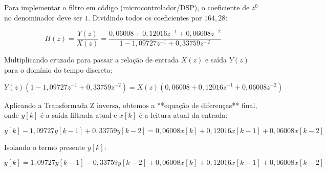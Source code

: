 Para implementar o filtro em código (microcontrolador/DSP), o coeficiente de $z^0$ no denominador deve ser $1$. Dividindo todos os coeficientes por $164{,}28$:

$$H(z) = \frac{Y(z)}{X(z)} = \frac{0{,}06008 + 0{,}12016z^{-1} + 0{,}06008z^{-2}}{1 - 1{,}09727z^{-1} + 0{,}33759z^{-2}}$$

Multiplicando cruzado para passar a relação de entrada $X(z)$ e saída $Y(z)$ para o domínio do tempo discreto:

$$Y(z) \left( 1 - 1{,}09727z^{-1} + 0{,}33759z^{-2} \right) = X(z) \left( 0{,}06008 + 0{,}12016z^{-1} + 0{,}06008z^{-2} \right)$$

Aplicando a Transformada Z inversa, obtemos a **equação de diferenças** final, onde $y[k]$ é a saída filtrada atual e $x[k]$ é a leitura atual da entrada:

$$y[k] - 1{,}09727y[k-1] + 0{,}33759y[k-2] = 0{,}06008x[k] + 0{,}12016x[k-1] + 0{,}06008x[k-2]$$

Isolando o termo presente $y[k]$:

$$y[k] = 1{,}09727y[k-1] - 0{,}33759y[k-2] + 0{,}06008x[k] + 0{,}12016x[k-1] + 0{,}06008x[k-2]$$